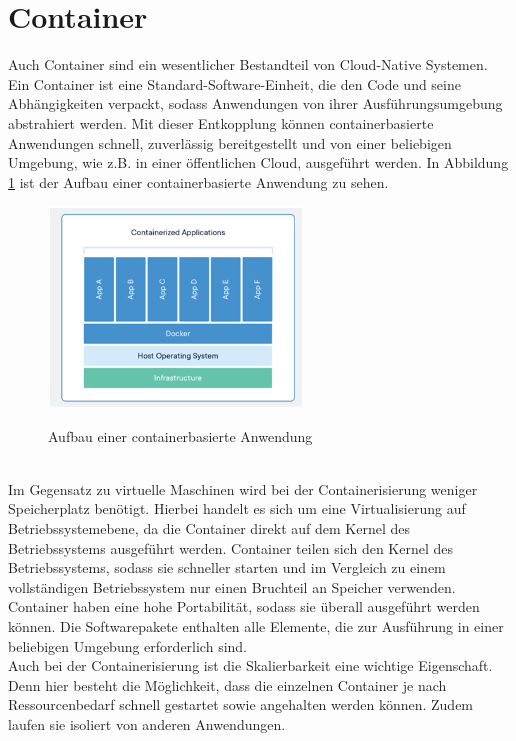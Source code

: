\section{Container}
Auch Container sind ein wesentlicher Bestandteil von Cloud-Native Systemen.\\
Ein Container ist eine Standard-Software-Einheit, die den Code und seine Abhängigkeiten verpackt, sodass Anwendungen von ihrer Ausführungsumgebung abstrahiert werden. Mit dieser Entkopplung können containerbasierte Anwendungen schnell, zuverlässig bereitgestellt und von einer beliebigen Umgebung, wie z.B. in einer öffentlichen Cloud, ausgeführt werden. In Abbildung \ref{container} ist der Aufbau einer containerbasierte Anwendung zu sehen.\\
\begin{figure}[bth] 
	\centering
	\includegraphics[width=0.6\textwidth]{Graphics/Container.png}
	\caption{Aufbau einer containerbasierte Anwendung}
	\label{container}
	\cite{container}
\end{figure}\\
Im Gegensatz zu virtuelle Maschinen wird bei der Containerisierung weniger Speicherplatz benötigt. Hierbei handelt es sich um eine Virtualisierung auf Betriebssystemebene, da die Container direkt auf dem Kernel des Betriebssystems ausgeführt werden. Container teilen sich den Kernel des Betriebssystems, sodass sie schneller starten und im Vergleich zu einem vollständigen Betriebssystem nur einen Bruchteil an Speicher verwenden.\\
Container haben eine hohe Portabilität, sodass sie überall ausgeführt werden können. Die Softwarepakete enthalten alle Elemente, die zur Ausführung in einer beliebigen Umgebung erforderlich sind.\\
Auch bei der Containerisierung ist die Skalierbarkeit eine wichtige Eigenschaft. Denn hier besteht die Möglichkeit, dass die einzelnen Container je nach Ressourcenbedarf schnell gestartet sowie angehalten werden können. Zudem laufen sie isoliert von anderen Anwendungen.\cite{container}\\
